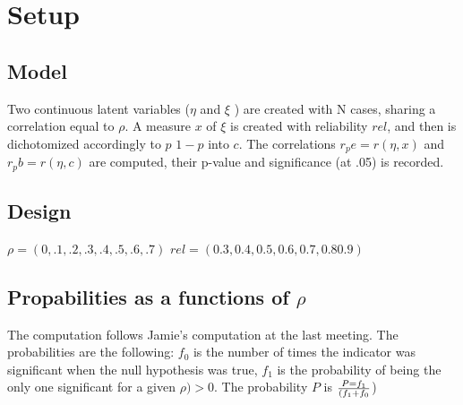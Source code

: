 \documentclass{article}
\begin{document}
\section*{Setup}
\subsection*{Model}
Two continuous latent variables (\(\eta\) and \(\xi\) ) are created with N cases, sharing a correlation equal to \(\rho\). A measure \(x\) of \(\xi\) is created with reliability \(rel\), and then  is dichotomized accordingly to \(p\) \(1-p\) into \(c\). The correlations \( r_pe=r(\eta,x) \)  and \( r_pb=r(\eta,c) \) are computed, their p-value and significance (at .05) is recorded.
\subsection*{Design}
\(\rho=(0,.1,.2,.3,.4,.5,.6,.7) \)
\(rel=(0.3, 0.4 ,0.5, 0.6, 0.7 ,0.8 0.9) \) 

\subsection*{Propabilities as a functions of \(\rho\)}

The computation follows Jamie's computation at the last meeting. The probabilities are the following: \(f_0\) is the number of times the indicator was significant when the null hypothesis was true, \(f_1\) is the probability of being the only one significant for a given \(\rho)>0\). The probability \(P\) is \(P= f_1 \over (f_1+f_0 \))  
\end{document}

